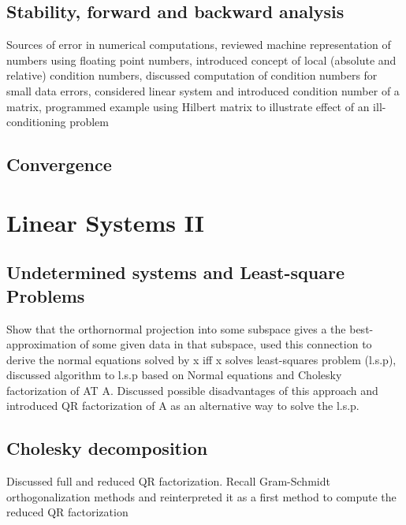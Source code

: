 \documentclass{article}
\theoremstyle{remark}
\begin{document}
\subsection{Stability, forward and backward analysis}%
\label{sub:stability_forward_and_backward_analysis}

\begin{tcolorbox}
  Sources of error in numerical computations, reviewed machine representation of numbers using floating point numbers, introduced concept of local (absolute and relative) condition numbers, discussed computation of condition numbers for small data errors, considered linear system and introduced condition number of a matrix, programmed example using Hilbert matrix to illustrate effect of an ill-conditioning problem	
\end{tcolorbox}
\subsection{Convergence}%
\label{sub:convergence}

\newpage
\section{Linear Systems II}%
\label{sec:linear_systems_ii}

\subsection{Undetermined systems and Least-square Problems}%
\label{sub:undetermined_systems_and_least_square_problems}
\begin{tcolorbox}
  Show that the orthornormal projection into some subspace gives a the best-approximation of some given data in that subspace, used this connection to derive the normal equations solved by x iff x solves least-squares problem (l.s.p), discussed algorithm to l.s.p based on Normal equations and Cholesky factorization of AT A. Discussed possible disadvantages of this approach and introduced QR factorization of A as an alternative way to solve the l.s.p.	
\end{tcolorbox}

\subsection{Cholesky decomposition}%
\label{sub:chelesky_decomposition}
\begin{tcolorbox}
  Discussed full and reduced QR factorization. Recall Gram-Schmidt orthogonalization methods and reinterpreted it as a first method to compute the reduced QR factorization	
\end{tcolorbox}
\end{document}
